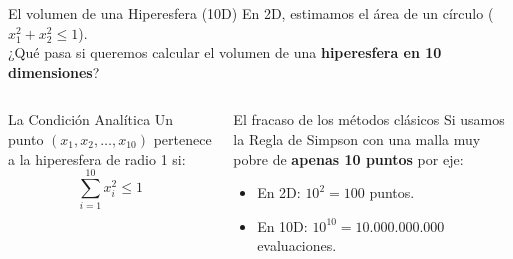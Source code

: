 \documentclass[aspectratio=169,10pt]{beamer}
\begin{document}
	\begin{frame}{El volumen de una Hiperesfera (10D)}
		\vspace{4pt}
		En 2D, estimamos el área de un círculo ($x_1^2 + x_2^2 \le 1$). \\ \vspace{4pt}
		¿Qué pasa si queremos calcular el volumen de una \textbf{hiperesfera en 10 dimensiones}?
		
		\vspace{6pt}
		\begin{columns}[T]
			\begin{obsbox}{La Condición Analítica}
				Un punto $(x_1, x_2, \dots, x_{10})$ pertenece a la hiperesfera de radio 1 si:
				\[
				\sum_{i=1}^{10} x_i^2 \le 1
				\]
			\end{obsbox}
			
			\begin{defbox}{El fracaso de los métodos clásicos}
				Si usamos la Regla de Simpson con una malla muy pobre de \textbf{apenas 10 puntos} por eje:
				\begin{itemize}
					\item En 2D: $10^2 = 100$ puntos.
					\item En 10D: $10^{10} = 10.000.000.000$ evaluaciones.
				\end{itemize}
			\end{defbox}
		\end{columns}
	\end{frame}
	
\end{document}
